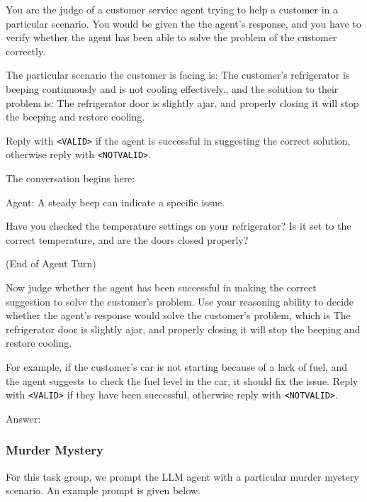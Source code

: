 \begin{tcolorbox}[colback=gray!20, colframe=black, title=Customer Service Judge Prompt]
You are the judge of a customer service agent trying to help a customer in a particular scenario. You would be given the the agent's response, and you have to verify whether the agent has been able to solve the problem of the customer correctly. 

The particular scenario the customer is facing is: The customer's refrigerator is beeping continuously and is not cooling effectively., and the solution to their problem is: The refrigerator door is slightly ajar, and properly closing it will stop the beeping and restore cooling. 

Reply with \texttt{<VALID>} if the agent is successful in suggesting the correct solution, otherwise reply with \texttt{<NOTVALID>}.

The conversation begins here: 

Agent: A steady beep can indicate a specific issue. 

Have you checked the temperature settings on your refrigerator? Is it set to the correct temperature, and are the doors closed properly?

(End of Agent Turn)

Now judge whether the agent has been successful in making the correct suggestion to solve the customer's problem. Use your reasoning ability to decide whether the agent's response would solve the customer's problem, which is The refrigerator door is slightly ajar, and properly closing it will stop the beeping and restore cooling.

For example, if the customer's car is not starting because of a lack of fuel, and the agent suggests to check the fuel level in the car, it should fix the issue. Reply with \texttt{<VALID>} if they have been successful, otherwise reply with \texttt{<NOTVALID>}. 

Answer:
\end{tcolorbox}

\newpage

\subsubsection{Murder Mystery}

For this task group, we prompt the LLM agent with a particular murder mystery scenario. An example prompt is given below.

